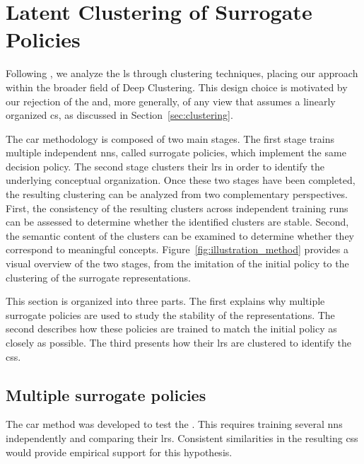 \section{Latent Clustering of Surrogate Policies}
\label{sec:clustering_agent_representation_method}

Following \textcite{zahavy2017graying}, we analyze the \gls{ls} through clustering techniques, placing our approach within the broader field of Deep Clustering.
This design choice is motivated by our rejection of the \SuperpositionHypothesisName and, more generally, of any view that assumes a linearly organized \gls{cs}, as discussed in Section~\ref{sec:clustering}.

The \gls{car} methodology is composed of two main stages.
The first stage trains multiple independent \glspl{nn}, called surrogate policies, which implement the same decision policy.
The second stage clusters their \glspl{lr} in order to identify the underlying conceptual organization.
Once these two stages have been completed, the resulting clustering can be analyzed from two complementary perspectives.
First, the consistency of the resulting clusters across independent training runs can be assessed to determine whether the identified clusters are stable.
Second, the semantic content of the clusters can be examined to determine whether they correspond to meaningful concepts.
Figure~\ref{fig:illustration_method} provides a visual overview of the two stages, from the imitation of the initial policy to the clustering of the surrogate representations.



This section is organized into three parts.
The first explains why multiple surrogate policies are used to study the stability of the representations.
The second describes how these policies are trained to match the initial policy as closely as possible.
The third presents how their \glspl{lr} are clustered to identify the \glspl{cs}.

\subsection{Multiple surrogate policies}

The \gls{car} method was developed to test the \RepresentationConvergenceHypothesisName.
This requires training several \glspl{nn} independently and comparing their \glspl{lr}.
Consistent similarities in the resulting \glspl{cs} would provide empirical support for this hypothesis.

